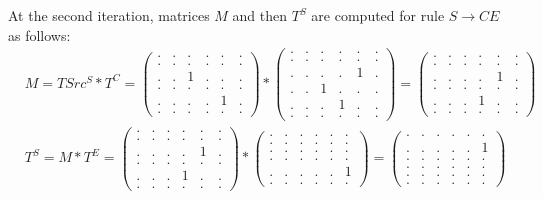 At the second iteration, matrices $M$ and then $T^S$ are computed for rule $S \to C E$ as follows:
{
    \renewcommand{\arraystretch}{0.7}
    \setlength\arraycolsep{2pt}
\begin{align*}
&M = TSrc^S * T^C =
\begin{pmatrix}
    . & . & . & . & . & . \\
    . & . & . & . & . & . \\
    . & . & 1 & . & . & . \\
    . & . & . & . & . & . \\
    . & . & . & . & 1 & . \\
    . & . & . & . & . & .
\end{pmatrix} *
\begin{pmatrix}
    . & . & . & . & . & . \\
    . & . & . & . & . & . \\
    . & . & . & . & 1 & . \\
    . & . & 1 & . & . & . \\
    . & . & . & 1 & . & . \\
    . & . & . & . & . & .
\end{pmatrix}=
\begin{pmatrix}
    . & . & . & . & . & . \\
    . & . & . & . & . & . \\
    . & . & . & . & 1 & . \\
    . & . & . & . & . & . \\
    . & . & . & 1 & . & . \\
    . & . & . & . & . & .
\end{pmatrix}
\\
&T^S = M * T^E =
\begin{pmatrix}
    . & . & . & . & . & . \\
    . & . & . & . & . & . \\
    . & . & . & . & 1 & . \\
    . & . & . & . & . & . \\
    . & . & . & 1 & . & . \\
    . & . & . & . & . & .
\end{pmatrix} *
\begin{pmatrix}
    . & . & . & . & . & . \\
    . & . & . & . & . & . \\
    . & . & . & . & . & . \\
    . & . & . & . & . & . \\
    . & . & . & . & . & 1 \\
    . & . & . & . & . & .
\end{pmatrix} =
\begin{pmatrix}
    . & . & . & . & . & . \\
    . & . & . & . & . & 1 \\
    . & . & . & . & . & . \\
    . & . & . & . & . & . \\
    . & . & . & . & . & . \\
    . & . & . & . & . & .
\end{pmatrix}
\end{align*}
}

